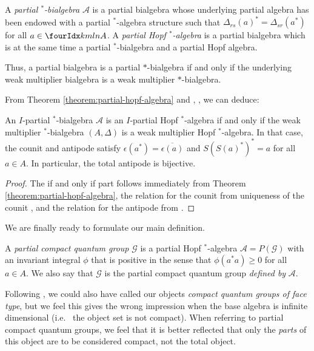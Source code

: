 \begin{Def} A \emph{partial $^*$-bialgebra} $\mathscr{A}$ is a
 partial bialgebra whose underlying partial algebra has been
  endowed with a partial $^*$-algebra structure such that
$\Delta_{rs}(a)^* = \Delta_{sr}(a^*)$ for all $a \in \Gr{A}{k}{l}{m}{n}$.
A \emph{partial Hopf $^*$-algebra} is a partial bialgebra which is at the same time a partial $^*$-bialgebra and a partial Hopf algebra.
\end{Def} 
Thus, a partial bialgebra is a partial
$*$-bialgebra if and only if the underlying weak multiplier bialgebra
 is a weak multiplier $*$-bialgebra.

From Theorem \ref{theorem:partial-hopf-algebra} and \cite{Boh1},
\cite{VDW1}, we can deduce:
\begin{Cor} \label{cor:involutive}
  An $I$-partial $^*$-bialgebra $\mathscr{A}$ is an $I$-partial Hopf
  $^*$-algebra if and only if the weak multiplier $^*$-bialgebra
  $(A,\Delta)$ is a weak multiplier Hopf $^*$-algebra. In that case,
  the counit and antipode satisfy
  $\epsilon(a^{*})=\overline{\epsilon(a)}$ and $S(S(a)^{*})^{*}=a$ for
  all $a\in A$. In particular, the total antipode is bijective.
\end{Cor}
\begin{proof}
  The if and only if part follows immediately from  Theorem
  \ref{theorem:partial-hopf-algebra}, the relation for the counit  from
uniqueness of the counit  \cite[Theorem 2.8]{Boh1}, and the relation
for the antipode from \cite[Proposition 4.11]{VDW1}.
\end{proof}


We are finally ready to formulate our main definition.
\begin{Def} A \emph{partial compact quantum group} $\mathscr{G}$ is a
  partial Hopf $^*$-algebra $\mathscr{A} = P(\mathscr{G})$ with an invariant integral  $\phi$ that is positive in the sense  that $\phi(a^*a)\geq 0$ for all $a\in A$. We also say that $\mathscr{G}$ is the partial compact quantum group \emph{defined by} $\mathscr{A}$.
\end{Def} 

\begin{Rem} Following \cite{Hay1}, we could also have called our objects \emph{compact quantum groups of face type}, but we feel this gives the wrong impression when the base algebra is infinite dimensional (i.e.~ the object set is not compact). When referring to partial compact quantum groups, we feel that it is better reflected that only the \emph{parts} of this object are to be considered compact, not the total object. %
\end{Rem} 


